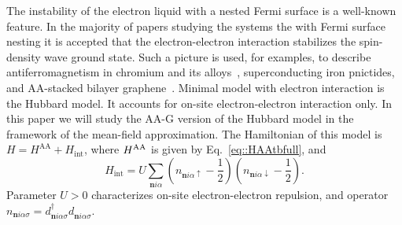 \documentclass[prb,twocolumn,showpacs,aps,superscriptaddress,floatfix]{revtex4}
\begin{document}
The instability of the electron liquid with a nested Fermi surface is a
well-known feature. In the majority of papers studying the systems the with
Fermi surface nesting it is accepted that the electron-electron interaction
stabilizes the spin-density wave ground state. Such a picture is used, for
examples, to describe antiferromagnetism in chromium and its
alloys~\cite{Rice,Fawcet_RMP1988_SDW_Cr},
superconducting iron
pnictides\cite{eremin_chub2010,teitel2010,OurPnics2013},
and AA-stacked bilayer
graphene~\cite{PrlOur,PrbROur,PrbOur}.
Minimal model with electron interaction is the Hubbard model. It accounts
for on-site electron-electron interaction only. In this paper we will study
the AA-G version of the Hubbard model  in the framework of the mean-field
approximation. The Hamiltonian of this model is
$H=H^{\text{AA}}+H_{\text{int}}$,
where
$H^{\rm AA}$
is given by
Eq.~\eqref{eq::HAAtbfull}, and
\begin{equation}\label{eq::hubb_H}
H_{\text{int}}=U\sum_{\mathbf{n}i\alpha}\left(n_{\mathbf{n}i\alpha\uparrow}-\frac{1}{2}\right)\left(n_{\mathbf{n}i\alpha\downarrow}-\frac{1}{2}\right).
\end{equation}
Parameter
$U>0$
characterizes on-site electron-electron repulsion, and operator
$n_{\mathbf{n}i\alpha\sigma}=d^\dag_{\mathbf{n}i\alpha\sigma}d^{\phantom{\dag}}_{\mathbf{n}i\alpha\sigma}$.
\end{document}

